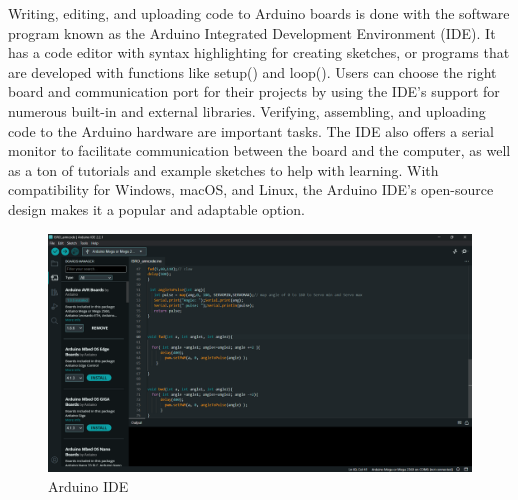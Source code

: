 \documentclass[12pt,a4paper]{report}
\begin{document}
\begin{itemize}
\par Writing, editing, and uploading code to Arduino boards is done with the software program known as the Arduino Integrated Development Environment (IDE). It has a code editor with syntax highlighting for creating sketches, or programs that are developed with functions like setup() and loop(). Users can choose the right board and communication port for their projects by using the IDE's support for numerous built-in and external libraries. Verifying, assembling, and uploading code to the Arduino hardware are important tasks. The IDE also offers a serial monitor to facilitate communication between the board and the computer, as well as a ton of tutorials and example sketches to help with learning. With compatibility for Windows, macOS, and Linux, the Arduino IDE's open-source design makes it a popular and adaptable option.


\begin{figure}[!htb]
\begin{center}
\includegraphics[scale=0.2]{images/platform_SS/Screenshot (45).png}
\caption{Arduino IDE }
\end{center}
\end{figure}








\end{itemize}





\newpage
\end{document}
